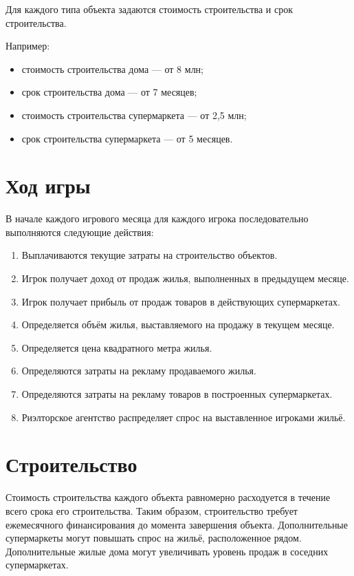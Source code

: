 \documentclass[a4paper,12pt]{article}
\begin{document}
Для каждого типа объекта задаются стоимость строительства и срок строительства.

Например:
\begin{itemize}
    \item стоимость строительства дома --- от 8 млн;
    \item срок строительства дома --- от 7 месяцев;
    \item стоимость строительства супермаркета --- от 2,5 млн;
    \item срок строительства супермаркета --- от 5 месяцев.
\end{itemize}

\section{Ход игры}

В начале каждого игрового месяца для каждого игрока последовательно выполняются следующие действия:
\begin{enumerate}
    \item Выплачиваются текущие затраты на строительство объектов.
    \item Игрок получает доход от продаж жилья, выполненных в предыдущем месяце.
    \item Игрок получает прибыль от продаж товаров в действующих супермаркетах.
    \item Определяется объём жилья, выставляемого на продажу в текущем месяце.
    \item Определяется цена квадратного метра жилья.
    \item Определяются затраты на рекламу продаваемого жилья.
    \item Определяются затраты на рекламу товаров в построенных супермаркетах.
    \item Риэлторское агентство распределяет спрос на выставленное игроками жильё.
\end{enumerate}

\section{Строительство}

Стоимость строительства каждого объекта равномерно расходуется в течение всего срока его строительства.
Таким образом, строительство требует ежемесячного финансирования до момента завершения объекта.
Дополнительные супермаркеты могут повышать спрос на жильё, расположенное рядом.
Дополнительные жилые дома могут увеличивать уровень продаж в соседних супермаркетах.
\end{document}
